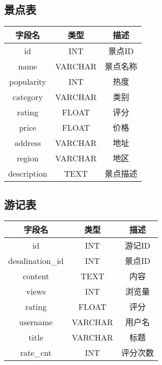 \documentclass{ctexart}
\begin{document}
\subsection{景点表}
\begin{center}
    \begin{tabular}{ccc}
        \toprule
        字段名         & 类型      & 描述   \\
        \midrule
        id          & INT     & 景点ID \\
        name        & VARCHAR & 景点名称 \\
        popularity  & INT     & 热度   \\
        category    & VARCHAR & 类别   \\
        rating      & FLOAT   & 评分   \\
        price       & FLOAT   & 价格   \\
        address     & VARCHAR & 地址   \\
        region      & VARCHAR & 地区   \\
        description & TEXT    & 景点描述 \\
        \bottomrule
    \end{tabular}
\end{center}

\subsection{游记表}
\begin{center}
    \begin{tabular}{ccc}
        \toprule
        字段名              & 类型      & 描述   \\
        \midrule
        id               & INT     & 游记ID \\
        desalination\_id & INT     & 景点ID \\
        content          & TEXT    & 内容   \\
        views            & INT     & 浏览量  \\
        rating           & FLOAT   & 评分   \\
        username         & VARCHAR & 用户名  \\
        title            & VARCHAR & 标题   \\
        rate\_cnt        & INT     & 评分次数 \\
        \bottomrule
    \end{tabular}
\end{center}
\end{document}

